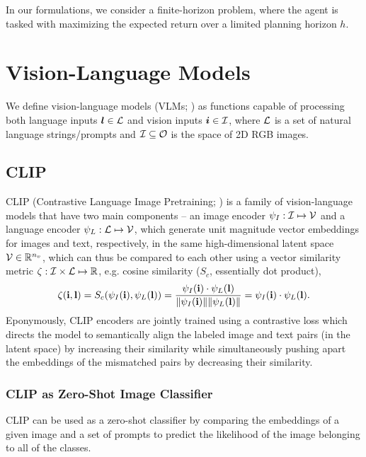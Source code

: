 In our formulations, we consider a finite-horizon problem, where the agent is tasked with maximizing the expected return over a limited planning horizon \(h\).

\section{Vision-Language Models}
\label{sec:vlms}

We define vision-language models (VLMs; \cite{vlmsurvey}) as functions capable of processing both language inputs \(\bm{l} \in \mathcal{L}\) and vision inputs \(\bm{i} \in \mathcal{I}\), where \(\mathcal{L}\) is a set of natural language strings/prompts and \(\mathcal{I} \subseteq \mathcal{O}\) is the space of 2D RGB images.

\subsection{CLIP}
\label{sec:clip}
CLIP (Contrastive Language Image Pretraining; \cite{clip}) is a family of vision-language models that have two main components -- an image encoder \(\psi_I: \mathcal{I} \mapsto \mathcal{V}\) and a language encoder \(\psi_L: \mathcal{L} \mapsto \mathcal{V}\), which generate unit magnitude vector embeddings for images and text, respectively, in the same high-dimensional latent space \(\mathcal{V} \in \mathbb{R}^{n_v}\), which can thus be compared to each other using a vector similarity metric \(\zeta: \mathcal{I} \times \mathcal{L} \mapsto \mathbb{R}\), e.g. cosine similarity (\(S_c\), essentially dot product),
\begin{equation}
    \label{eq:clip-similarity}
    \zeta(\mathbf{i}, \mathbf{l}) = S_c(\psi_I(\mathbf{i}), \psi_L(\mathbf{l})) = \frac{\psi_I(\mathbf{i}) \cdot \psi_L(\mathbf{l})}{\| \psi_I(\mathbf{i}) \| \| \psi_L(\mathbf{l}) \|} = \psi_I(\mathbf{i}) \cdot \psi_L(\mathbf{l}).
\end{equation}
Eponymously, CLIP encoders are jointly trained using a contrastive loss which directs the model to semantically align the labeled image and text pairs (in the latent space) by increasing their similarity while simultaneously pushing apart the embeddings of the mismatched pairs by decreasing their similarity.

\subsubsection{CLIP as Zero-Shot Image Classifier}
\label{sec:clip-classifier}
CLIP can be used as a zero-shot classifier by comparing the embeddings of a given image and a set of prompts to predict the likelihood of the image belonging to all of the classes.

